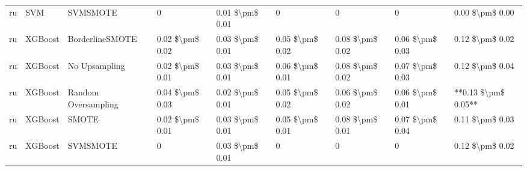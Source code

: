 \begin{tabular}{lllllllll}
      ru &                             SVM &                      SVMSMOTE &               0 &           0.01 \$\textbackslash pm\$ 0.01 &                     0 &                      0 &                                       0 &     0.00 \$\textbackslash pm\$ 0.00 \\
      ru &                         XGBoost &               BorderlineSMOTE & 0.02 \$\textbackslash pm\$ 0.02 &           0.03 \$\textbackslash pm\$ 0.01 &       0.05 \$\textbackslash pm\$ 0.02 &        0.08 \$\textbackslash pm\$ 0.02 &                         0.06 \$\textbackslash pm\$ 0.03 &     0.12 \$\textbackslash pm\$ 0.02 \\
      ru &                         XGBoost &                 No Upsampling & 0.02 \$\textbackslash pm\$ 0.01 &           0.03 \$\textbackslash pm\$ 0.01 &       0.06 \$\textbackslash pm\$ 0.01 &        0.08 \$\textbackslash pm\$ 0.02 &                         0.07 \$\textbackslash pm\$ 0.03 &     0.12 \$\textbackslash pm\$ 0.04 \\
      ru &                         XGBoost &           Random Oversampling & 0.04 \$\textbackslash pm\$ 0.03 &           0.02 \$\textbackslash pm\$ 0.01 &       0.05 \$\textbackslash pm\$ 0.02 &        0.06 \$\textbackslash pm\$ 0.02 &                         0.06 \$\textbackslash pm\$ 0.01 & **0.13 \$\textbackslash pm\$ 0.05** \\
      ru &                         XGBoost &                         SMOTE & 0.02 \$\textbackslash pm\$ 0.01 &           0.03 \$\textbackslash pm\$ 0.01 &       0.05 \$\textbackslash pm\$ 0.01 &        0.08 \$\textbackslash pm\$ 0.01 &                         0.07 \$\textbackslash pm\$ 0.04 &     0.11 \$\textbackslash pm\$ 0.03 \\
      ru &                         XGBoost &                      SVMSMOTE &               0 &           0.03 \$\textbackslash pm\$ 0.01 &                     0 &                      0 &                                       0 &     0.12 \$\textbackslash pm\$ 0.02 \\
\bottomrule
\end{tabular}
